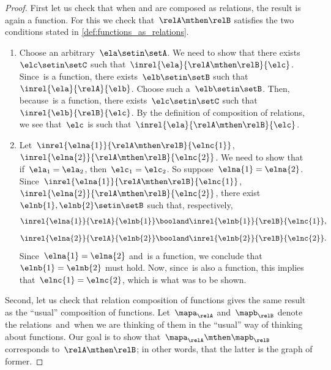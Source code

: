 \begin{proof}
    First let us check that when \relA and \relB are composed as relations, the result is again a function.
    For this we check that~$\relA \mthen \relB$ satisfies the two conditions stated in \cref{def:functions_as_relations}.

    \begin{enumerate}
        \item Choose an arbitrary~$\ela \setin \setA$.
              We need to show that there exists~$\elc \setin \setC$ such that~$\inrel{\ela}{\relA \mthen \relB}{\elc}$.
              Since~\relA is a function, there exists~$\elb \setin \setB$ such that~$\inrel{\ela}{\relA}{\elb}$.
              Choose such a~$\elb \setin \setB$.
              Then, because~\relB is a function, there exists~$\elc \setin \setC$ such that~$\inrel{\elb}{\relB}{\elc}$.
              By the definition of composition of relations, we see that~$\elc$ is such that~$\inrel{\ela}{\relA \mthen \relB}{\elc}$.
        \item Let~$\inrel{\elna{1}}{\relA \mthen \relB}{\elnc{1}}$,~$\inrel{\elna{2}}{\relA \mthen \relB}{\elnc{2}}$.
              We need to show that if~$\ela_1 = \ela_2$, then~$\elc_1 = \elc_2$.
              So suppose~$\elna{1} = \elna{2}$.
              Since~$\inrel{\elna{1}}{\relA \mthen \relB}{\elnc{1}}$,~$\inrel{\elna{2}}{\relA \mthen \relB}{\elnc{2}}$, there exist~$\elnb{1}, \elnb{2} \setin \setB$ such that, respectively,
              \begin{equation}
                  \inrel{\elna{1}}{\relA}{\elnb{1}} \booland \inrel{\elnb{1}}{\relB}{\elnc{1}},
              \end{equation}
              \begin{equation}
                  \inrel{\elna{2}}{\relA}{\elnb{2}} \booland \inrel{\elnb{2}}{\relB}{\elnc{2}}.
              \end{equation}
              Since~$\elna{1} = \elna{2}$ and~\relA is a function, we conclude that~$\elnb{1} = \elnb{2}$ must hold.
              Now, since~\relB is also a function, this implies that~$\elnc{1} = \elnc{2}$, which is what was to be shown.
    \end{enumerate}

    Second, let us check that relation composition of functions gives the same result as the ``usual'' composition of functions.
    Let~$\mapa_{\relA}$ and~$\mapb_{\relB}$ denote the relations~\relA and~\relB when we are thinking of them in the ``usual'' way of thinking about functions.
    Our goal is to show that~$\mapa_{\relA} \mthen \mapb_{\relB}$ corresponds to~$\relA \mthen \relB$; in other words, that the latter is the graph of former.


\end{proof}
